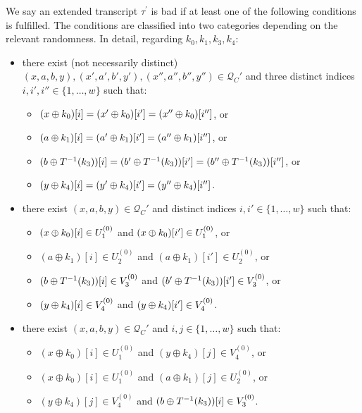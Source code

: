 \begin{definition}
	\label{defn:bad-tau-4-rounds}
	
	We say an extended transcript $\tau^{\prime}$ is bad if at least one of the following conditions is fulfilled. The conditions are classified into two categories depending on the relevant randomness. In detail, regarding $k_0,k_1,k_3,k_4$:
	\begin{itemize}[leftmargin=10mm]
		\item[\bone] there exist (not necessarily distinct) $(x,a,b,y),(x',a',b',y'),(x'',a'',b'',y'')\in \mathcal{Q}_{C}'$ and three distinct indices $i, i', i'' \in \{1, \ldots, w\}$ such that:
		\begin{itemize}
			\item $(x\oplus k_0)[i]=(x'\oplus k_0)[i']=(x''\oplus k_0)[i'']$, or
			\item $(a\oplus k_1)[i]=(a'\oplus k_1)[i']=(a''\oplus k_1)[i'']$, or
			\item $(b\oplus T^{-1}(k_3))[i]=(b'\oplus T^{-1}(k_3))[i']=(b''\oplus T^{-1}(k_3))[i'']$, or
			\item $(y\oplus k_4)[i]=(y'\oplus k_4)[i']=(y''\oplus k_4)[i'']$.
		\end{itemize}
		\item[\btwo] there exist $(x,a,b,y) \in \mathcal{Q}_{C}'$ and distinct indices $i, i' \in \{1, \ldots, w\}$ such that:
		\begin{itemize}
			\item $(x\oplus k_0)[i]\in U_1^{(0)}$ and $(x\oplus k_0)[i']\in U_1^{(0)}$, or
			\item $(a \oplus k_1)[i]\in U_{2}^{(0)}$ and $(a \oplus k_1)[i']\in U_{2}^{(0)}$, or
			\item $(b\oplus T^{-1}(k_3))[i]\in V_3^{(0)}$ and
			$(b'\oplus T^{-1}(k_3))[i']\in V_3^{(0)}$, or
			\item $(y\oplus k_4)[i]\in V_4^{(0)}$ and $(y\oplus k_4)[i']\in V_4^{(0)}$.
		\end{itemize}
		\item[\bthree] there exist $(x,a,b,y) \in \mathcal{Q}_{C}'$ and $i, j \in \{1, \ldots, w\}$ such that:
		\begin{itemize}
			\item $\left(x \oplus k_{0}\right)[i]\in U_1^{(0)}$ and $\left(y \oplus k_{4}\right)[j]\in V_4^{(0)}$, or
			\item $\left(x \oplus k_{0}\right)[i]\in U_1^{(0)}$ and $\left(a\oplus k_{1}\right)[j]\in U_2^{(0)}$, or
			\item $\left(y \oplus k_{4}\right)[j]\in V_4^{(0)}$ and $(b\oplus T^{-1}(k_3)) [i]\in V_3^{(0)}$.

\end{itemize}
\end{itemize}
\end{definition}
